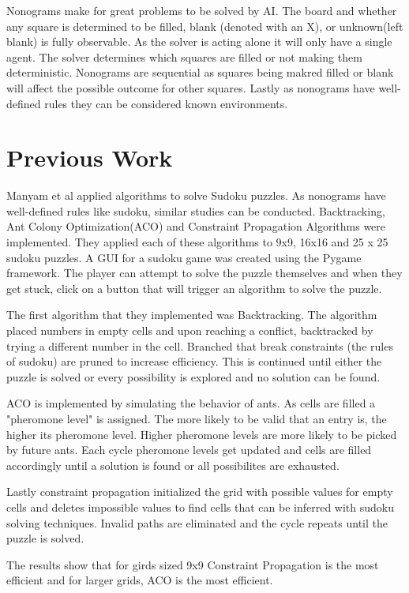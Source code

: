 \documentclass[12pt, letterpaper]{article}
\begin{document}
    Nonograms make for great problems to be solved by AI. The board and whether any square is determined to be filled, blank (denoted with an X), or unknown(left blank) is fully observable. As the solver is acting alone it will only have a single agent. The solver determines which squares are filled or not making them deterministic. Nonograms are sequential as squares being makred filled or blank will affect the possible outcome for other squares. Lastly as nonograms have well-defined rules they can be considered known environments.


\section{Previous Work}
    Manyam et al \cite{10863160} applied algorithms to solve Sudoku puzzles. As nonograms have well-defined rules like sudoku, similar studies can be conducted. Backtracking, Ant Colony Optimization(ACO) and Constraint Propagation Algorithms were implemented. They applied each of these algorithms to 9x9, 16x16 and 25 x 25 sudoku puzzles. A GUI for a sudoku game was created using the Pygame framework. The player can attempt to solve the puzzle themselves and when they get stuck, click on a button that will trigger an algorithm to solve the puzzle.

    The first algorithm that they implemented was Backtracking. The algorithm placed numbers in empty cells and upon reaching a conflict, backtracked by trying a different number in the cell. Branched that break constraints (the rules of sudoku) are pruned to increase efficiency. This is continued until either the puzzle is solved or every possibility is explored and no solution can be found.

    ACO is implemented by simulating the behavior of ants. As cells are filled a "pheromone level" is assigned. The more likely to be valid that an entry is, the higher its pheromone level. Higher pheromone levels are more likely to be picked by future ants. Each cycle pheromone levels get updated and cells are filled accordingly until a solution is found or all possibilites are exhausted.

    Lastly constraint propagation initialized the grid with possible values for empty cells and deletes impossible values to find cells that can be inferred with sudoku solving techniques. Invalid paths are eliminated and the cycle repeats until the puzzle is solved.

    The results show that for girds sized 9x9 Constraint Propagation is the most efficient and for larger grids, ACO is the most efficient.
\end{document}

